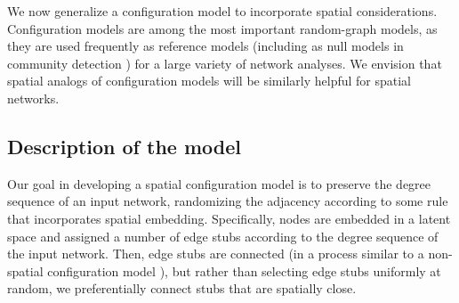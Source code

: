 \documentclass[%
 reprint,
 amsmath,amssymb,
 aps,
]{revtex4-1}
\begin{document}
We now generalize a configuration model \cite{fosdick, newman2018} to incorporate spatial considerations. Configuration models are among the most important random-graph models, as they are used frequently as reference models (including as null models in community detection \cite{community1, community2}) for a large variety of network analyses. We envision that spatial analogs of configuration models will be similarly helpful for spatial networks.


\subsection{Description of the model}

{\color{red}Our goal in developing a spatial configuration model is to preserve the degree sequence of an input network, randomizing the adjacency according to some rule that incorporates spatial embedding. Specifically, nodes are embedded in a latent space and assigned a number of edge stubs according to the degree sequence of the input network. Then, edge stubs are connected (in a process similar to a non-spatial configuration model \cite{fosdick}), but rather than selecting edge stubs uniformly at random, we preferentially connect stubs that are spatially close. }

\end{document}
